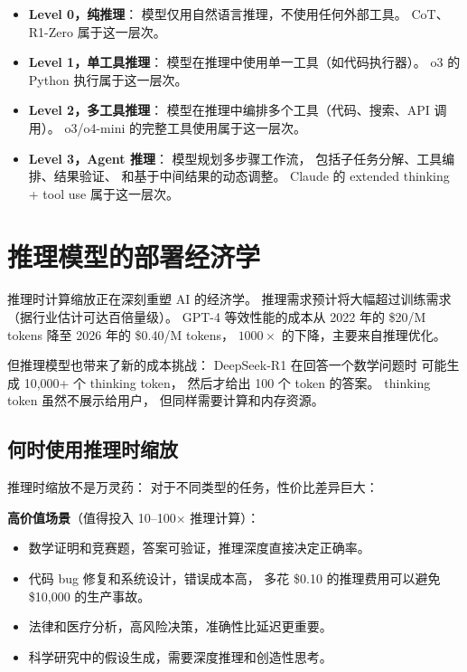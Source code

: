 \begin{keybox}[工具增强推理的层次]
\begin{itemize}[noitemsep]
  \item \textbf{Level 0，纯推理}：
        模型仅用自然语言推理，不使用任何外部工具。
        CoT、R1-Zero 属于这一层次。
  \item \textbf{Level 1，单工具推理}：
        模型在推理中使用单一工具（如代码执行器）。
        o3 的 Python 执行属于这一层次。
  \item \textbf{Level 2，多工具推理}：
        模型在推理中编排多个工具（代码、搜索、API 调用）。
        o3/o4-mini 的完整工具使用属于这一层次。
  \item \textbf{Level 3，Agent 推理}：
        模型规划多步骤工作流，
        包括子任务分解、工具编排、结果验证、
        和基于中间结果的动态调整。
        Claude 的 extended thinking + tool use 属于这一层次。
\end{itemize}
\end{keybox}


\section{推理模型的部署经济学}

推理时计算缩放正在深刻重塑 AI 的经济学。
推理需求预计将大幅超过训练需求（据行业估计可达百倍量级）。
GPT-4 等效性能的成本从 2022 年的 \$20/M tokens
降至 2026 年的 \$0.40/M tokens，
$1000\times$ 的下降，主要来自推理优化。

但推理模型也带来了新的成本挑战：
DeepSeek-R1 在回答一个数学问题时
可能生成 10,000+ 个 thinking token，
然后才给出 100 个 token 的答案。
thinking token 虽然不展示给用户，
但同样需要计算和内存资源。

\subsection{何时使用推理时缩放}

推理时缩放不是万灵药：
对于不同类型的任务，性价比差异巨大：

\textbf{高价值场景}（值得投入 10--100$\times$ 推理计算）：
\begin{itemize}[noitemsep]
  \item 数学证明和竞赛题，答案可验证，推理深度直接决定正确率。
  \item 代码 bug 修复和系统设计，错误成本高，
        多花 \$0.10 的推理费用可以避免 \$10,000 的生产事故。
  \item 法律和医疗分析，高风险决策，准确性比延迟更重要。
  \item 科学研究中的假设生成，需要深度推理和创造性思考。
\end{itemize}

